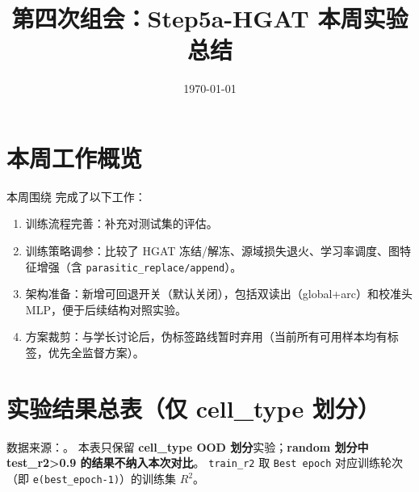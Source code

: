 \documentclass[12pt,a4paper]{ctexart}
\title{第四次组会：Step5a-HGAT 本周实验总结}
\author{}
\date{\today}
\begin{document}
\maketitle

\section{本周工作概览}
本周围绕  完成了以下工作：
\begin{enumerate}
  \item 训练流程完善：补充对测试集的评估。
  \item 训练策略调参：比较了 HGAT 冻结/解冻、源域损失退火、学习率调度、图特征增强（含 \texttt{parasitic\_replace/append}）。
  \item 架构准备：新增可回退开关（默认关闭），包括双读出（global+arc）和校准头 MLP，便于后续结构对照实验。
  \item 方案裁剪：与学长讨论后，伪标签路线暂时弃用（当前所有可用样本均有标签，优先全监督方案）。
\end{enumerate}

\section{实验结果总表（仅 cell\_type 划分）}
数据来源：。  
本表只保留 \textbf{cell\_type OOD 划分}实验；\textbf{random 划分中 test\_r2>0.9 的结果不纳入本次对比}。  
\texttt{train\_r2} 取 \texttt{Best epoch} 对应训练轮次（即 \texttt{e(best\_epoch-1)}）的训练集 \(R^2\)。
\end{document}

